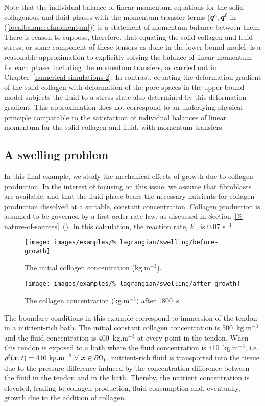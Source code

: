 Note that the individual balance of linear momentum equations for the
solid collagenous and fluid phases with the momentum transfer terms
($\mbox{\boldmath$ q$}^\mathrm{c}, \mbox{\boldmath$ q$}^\mathrm{f}$ in (\ref{localbalanceofmomentum}))
is a statement of momentum balance between them. There is reason to
suppose, therefore, that equating the solid collagen and fluid stress,
or some component of these tensors as done in the lower bound model,
is a reasonable approximation to explicitly solving the balance of
linear momentum for each phase, including the momentum transfers, as
carried out in Chapter~\ref{numerical-simulations-2}. In contrast,
equating the deformation gradient of the solid collagen with
deformation of the pore spaces in the upper bound model subjects the
fluid to a stress state also determined by this deformation
gradient. This approximation does not correspond to an underlying
physical principle comparable to the satisfaction of individual
balances of linear momentum for the solid collagen and fluid, with
momentum transfers.

\subsection{A swelling problem}
\label{swelling-1}

In this final example, we study the mechanical effects of growth due
to collagen production. In the interest of focusing on this issue, we
assume that fibroblasts are available, and that the fluid phase bears
the necessary nutrients for collagen production dissolved at a
suitable, constant concentration. Collagen production is assumed to be
governed by a first-order rate law, as discussed in Section~\ref{%
  nature-of-sources}~(). In this calculation, the
reaction rate, $k^\mathrm{f}$, is 0.07 $\mathrm{s}^{-1}$.

\begin{figure}[!hpt]
  \centering
  \texttt{[image: images/examples/\%
    lagrangian/swelling/before-growth]}
  \caption{The initial collagen concentration (kg.m$^{-3}$).}
  \label{before_growth}
\end{figure}

\begin{figure}[!hpt]
  \centering
  \texttt{[image: images/examples/\%
    lagrangian/swelling/after-growth]}
  \caption{The collagen concentration (kg.m$^{-3}$) after 1800~s.}
  \label{after_growth}
\end{figure}

The boundary conditions in this example correspond to immersion of the
tendon in a nutrient-rich bath. The initial constant collagen
concentration is 500~kg.m$^{-3}$ and the fluid concentration is
400~kg.m$^{-3}$ at every point in the tendon. When this tendon is
exposed to a bath where the fluid concentration is 410~kg.m$^{-3}$,
i.e. $\rho^\mathrm{f}(\bx,t)=410~\mathrm{kg.m}^{-3}\ \forall\ \bx \in
\partial\Omega_t$, nutrient-rich fluid is transported into the tissue
due to the pressure difference induced by the concentration difference
between the fluid in the tendon and in the bath. Thereby, the nutrient
concentration is elevated, leading to collagen production, fluid
consumption and, eventually, growth due to the addition of collagen.

